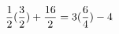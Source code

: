 \documentclass[preview]{standalone}
\begin{document}
\begin{align*}
\special{dvisvgm:raw <g id='unique000'>}\frac{1}{2} (\frac{3}{2}) + \frac{16}{2} = 3(\frac{6}{4}) - 4\special{dvisvgm:raw </g>}
\end{align*}
\end{document}

